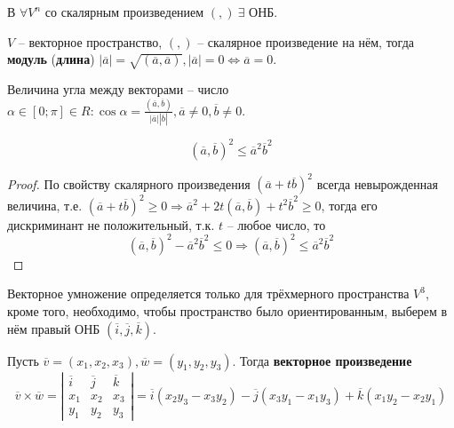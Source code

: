 	  \begin{Thm}
		  В $\forall V^n$ со скалярным произведением $(,) \ \exists$ ОНБ. 
	  \end{Thm}
  
	  \begin{Def}
		  $V$ -- векторное пространство, $(,)$ -- скалярное произведение на нём, тогда \textbf{модуль} (\textbf{длина}) $|\overline{a}| = \sqrt{(\overline{a}, \overline{a})}, |\overline{a}| = 0 \Leftrightarrow \overline{a} = 0$.
	  \end{Def}
	  
	  \begin{Def}
		  Величина угла между векторами -- число $\alpha \in [0; \pi] \in R: \cos \alpha = \frac{(\overline{a}, \overline{b})}{|\overline{a}||\overline{b}|}, \overline{a} \neq 0, \overline{b} \neq 0$.
	  \end{Def}
  
	  \begin{Thm}
		  $$(\overline{a}, \overline{b})^2 \leqslant \overline{a}^2 \overline{b}^2$$
	  \end{Thm}
  
	  \begin{proof}
		  По свойству скалярного произведения $(\overline{a} + t\overline{b})^2$ всегда невырожденная величина, т.е. $(\overline{a} + t\overline{b})^2 \geqslant 0 \Rightarrow \overline{a}^2 + 2t(\overline{a}, \overline{b}) + t^2 \overline{b}^2 \geqslant 0$, 
		  тогда его дискриминант не положительный, т.к. $t$ -- любое число, то $$(\overline{a}, \overline{b})^2 - \overline{a}^2 \overline{b}^2 \leqslant 0 \Rightarrow (\overline{a}, \overline{b})^2 \leqslant \overline{a}^2 \overline{b}^2$$
	  \end{proof}
  
  
	  Векторное умножение определяется только для трёхмерного пространства $V^3$, кроме того, необходимо, чтобы пространство было ориентированным, выберем в нём правый ОНБ $(\overline{i}, \overline{j}, \overline{k})$.
	  
	  \begin{figure}[h]
		  \centering
		  \def\svgwidth{0.2\columnwidth}
		  
	  \end{figure}
	  \begin{Def}
		  Пусть $\overline{v} = (x_1, x_2, x_3), \overline{w} = (y_1, y_2, y_3)$. Тогда \textbf{векторное произведение}
		  $$\overline{v} \times \overline{w} = \left|\begin{array}{cccc}
			  \overline{i} & \overline{j} & \overline{k} \\ 
			  x_1 & x_2 & x_3 \\ 
			  y_1 & y_2 & y_3
			  \end{array}\right| = \overline{i}(x_2 y_3 - x_3y_2) - \overline{j}(x_3 y_1 - x_1 y_3) + \overline{k}(x_1 y_2 - x_2 y_1)$$
	  \end{Def}
	  
